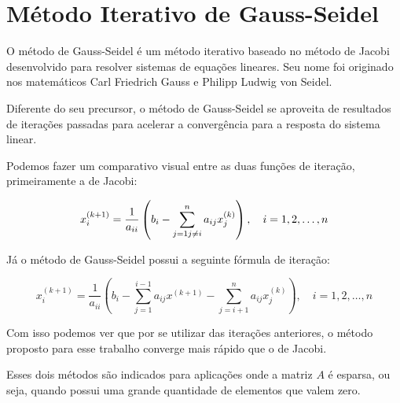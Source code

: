 \chapter{Método Iterativo de Gauss-Seidel}
O método de Gauss-Seidel é um método iterativo baseado no método de Jacobi desenvolvido para resolver sistemas de equações lineares. Seu nome foi originado nos matemáticos Carl Friedrich Gauss e Philipp Ludwig von Seidel.

Diferente do seu precursor, o método de Gauss-Seidel se aproveita de resultados de iterações passadas para acelerar a convergência para a resposta do sistema linear.

Podemos fazer um comparativo visual entre as duas funções de iteração, primeiramente a de Jacobi:

\[x_i^{(k+1)} = \dfrac{1}{a_{ii}}\left(b_i - \sum_{j=1\\j\neq i}^{n}{a_{ij}x_{j}^{(k)}}\right), \quad i = 1, 2, \ldots, n\]

Já o método de Gauss-Seidel possui a seguinte fórmula de iteração:

\[x_i^{(k+1)} = \dfrac{1}{a_{ii}}\left(b_i - \sum_{j=1}^{i-1}{a_{ij}x^{(k+1)}} - \sum_{j=i+1}^{n}{a_{ij}x_{j}^{(k)}}\right), \quad i = 1, 2, \ldots, n\]

Com isso podemos ver que por se utilizar das iterações anteriores, o método proposto para esse trabalho converge mais rápido que o de Jacobi.

Esses dois métodos são indicados para aplicações onde a matriz \(A\) é esparsa, ou seja, quando possui uma grande quantidade de elementos que valem zero.